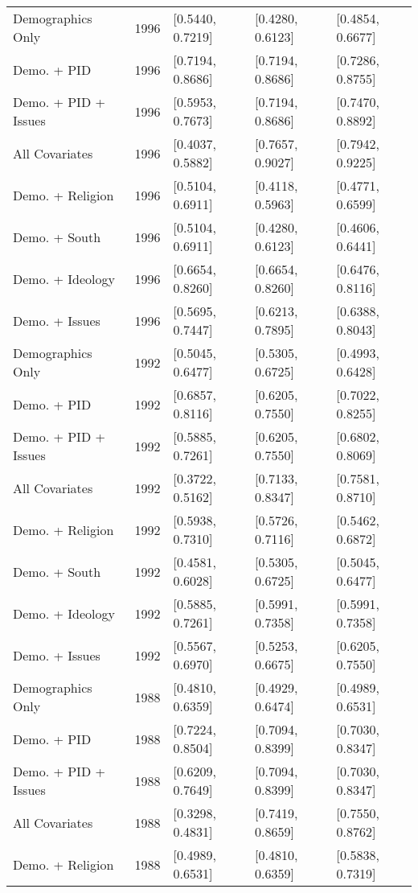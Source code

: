 \begin{longtable}{lrlll}
  Demographics Only & 1996 & [0.5440, 0.7219] & [0.4280, 0.6123] & [0.4854, 0.6677] \\ 
  Demo. + PID & 1996 & [0.7194, 0.8686] & [0.7194, 0.8686] & [0.7286, 0.8755] \\ 
  Demo. + PID + Issues & 1996 & [0.5953, 0.7673] & [0.7194, 0.8686] & [0.7470, 0.8892] \\ 
  All Covariates & 1996 & [0.4037, 0.5882] & [0.7657, 0.9027] & [0.7942, 0.9225] \\ 
  Demo. + Religion & 1996 & [0.5104, 0.6911] & [0.4118, 0.5963] & [0.4771, 0.6599] \\ 
  Demo. + South & 1996 & [0.5104, 0.6911] & [0.4280, 0.6123] & [0.4606, 0.6441] \\ 
  Demo. + Ideology & 1996 & [0.6654, 0.8260] & [0.6654, 0.8260] & [0.6476, 0.8116] \\ 
  Demo. + Issues & 1996 & [0.5695, 0.7447] & [0.6213, 0.7895] & [0.6388, 0.8043] \\ 
  Demographics Only & 1992 & [0.5045, 0.6477] & [0.5305, 0.6725] & [0.4993, 0.6428] \\ 
  Demo. + PID & 1992 & [0.6857, 0.8116] & [0.6205, 0.7550] & [0.7022, 0.8255] \\ 
  Demo. + PID + Issues & 1992 & [0.5885, 0.7261] & [0.6205, 0.7550] & [0.6802, 0.8069] \\ 
  All Covariates & 1992 & [0.3722, 0.5162] & [0.7133, 0.8347] & [0.7581, 0.8710] \\ 
  Demo. + Religion & 1992 & [0.5938, 0.7310] & [0.5726, 0.7116] & [0.5462, 0.6872] \\ 
  Demo. + South & 1992 & [0.4581, 0.6028] & [0.5305, 0.6725] & [0.5045, 0.6477] \\ 
  Demo. + Ideology & 1992 & [0.5885, 0.7261] & [0.5991, 0.7358] & [0.5991, 0.7358] \\ 
  Demo. + Issues & 1992 & [0.5567, 0.6970] & [0.5253, 0.6675] & [0.6205, 0.7550] \\ 
  Demographics Only & 1988 & [0.4810, 0.6359] & [0.4929, 0.6474] & [0.4989, 0.6531] \\ 
  Demo. + PID & 1988 & [0.7224, 0.8504] & [0.7094, 0.8399] & [0.7030, 0.8347] \\ 
  Demo. + PID + Issues & 1988 & [0.6209, 0.7649] & [0.7094, 0.8399] & [0.7030, 0.8347] \\ 
  All Covariates & 1988 & [0.3298, 0.4831] & [0.7419, 0.8659] & [0.7550, 0.8762] \\ 
  Demo. + Religion & 1988 & [0.4989, 0.6531] & [0.4810, 0.6359] & [0.5838, 0.7319] \\ 

\end{longtable}
